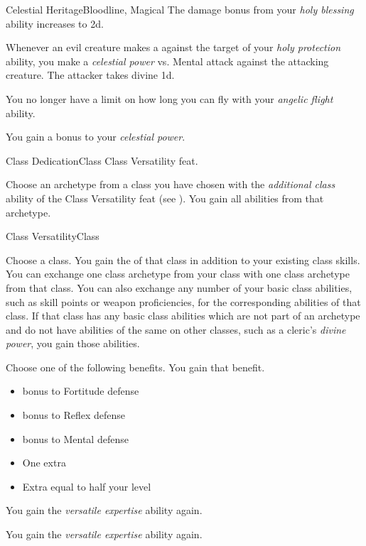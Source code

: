 \begin{feat}{Celestial Heritage}{Bloodline, Magical}
         The damage bonus from your \textit{holy blessing} ability increases to \plus2d.

         Whenever an evil creature makes a  against the target of your \textit{holy protection} ability, you make a \textit{celestial power} vs. Mental attack against the attacking creature.
        \hit The attacker takes divine  \minus1d.

         You no longer have a limit on how long you can fly with your \textit{angelic flight} ability.

         You gain a  bonus to your \textit{celestial power}.
    \end{feat}

    \begin{feat}{Class Dedication}{Class}
        \featpre Class Versatility feat.

         Choose an archetype from a class you have chosen with the \textit{additional class} ability of the Class Versatility feat (see ).
        You gain all abilities from that archetype.
    \end{feat}

    \begin{feat}{Class Versatility}{Class}

         Choose a class.
        You gain the  of that class in addition to your existing class skills.
        You can exchange one class archetype from your class with one class archetype from that class.
        You can also exchange any number of your basic class abilities, such as skill points or weapon proficiencies, for the corresponding abilities of that class.
        If that class has any basic class abilities which are not part of an archetype and do not have abilities of the same on other classes, such as a cleric's \textit{divine power}, you gain those abilities.

         Choose one of the following benefits.
        You gain that benefit.
        \begin{itemize}
            \item {} bonus to Fortitude defense
            \item {} bonus to Reflex defense
            \item {} bonus to Mental defense
            \item One extra 
            \item Extra  equal to half your level
        \end{itemize}

         You gain the \textit{versatile expertise} ability again.

         You gain the \textit{versatile expertise} ability again.
    \end{feat}

